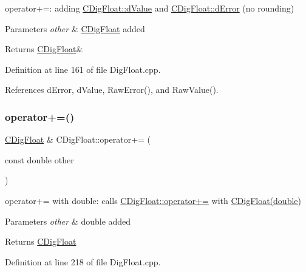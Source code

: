 operator+=\+: adding \hyperlink{classCDigFloat_a4bbe69e30dd4e20527362493aa9aaf96}{C\+Dig\+Float\+::d\+Value} and \hyperlink{classCDigFloat_a25eb3782d1e727ff007a48f8308e3d4d}{C\+Dig\+Float\+::d\+Error} (no rounding) 


\begin{DoxyParams}{Parameters}
{\em other} & \hyperlink{classCDigFloat}{C\+Dig\+Float} added \\
\hline
\end{DoxyParams}
\begin{DoxyReturn}{Returns}
\hyperlink{classCDigFloat}{C\+Dig\+Float}\& 
\end{DoxyReturn}


Definition at line 161 of file Dig\+Float.\+cpp.



References d\+Error, d\+Value, Raw\+Error(), and Raw\+Value().

\mbox{\label{classCDigFloat_a9fdc59da135bf2a165f28fa95258beb9}} 
\subsubsection{\texorpdfstring{operator+=()}{operator+=()}\hspace{0.1cm}{\footnotesize\ttfamily [2/2]}}
{\footnotesize\ttfamily \hyperlink{classCDigFloat}{C\+Dig\+Float} \& C\+Dig\+Float\+::operator+= (\begin{DoxyParamCaption}\item[{const double}]{other }\end{DoxyParamCaption})}



operator+= with double\+: calls \hyperlink{classCDigFloat_a84b2ad9b4d1a75aae261074ed7c6fefe}{C\+Dig\+Float\+::operator+=} with \hyperlink{classCDigFloat_a0ae24452dfb7838ec97a3998cd2b8f36}{C\+Dig\+Float(double)} 


\begin{DoxyParams}{Parameters}
{\em other} & double added \\
\hline
\end{DoxyParams}
\begin{DoxyReturn}{Returns}
\hyperlink{classCDigFloat}{C\+Dig\+Float} 
\end{DoxyReturn}


Definition at line 218 of file Dig\+Float.\+cpp.




